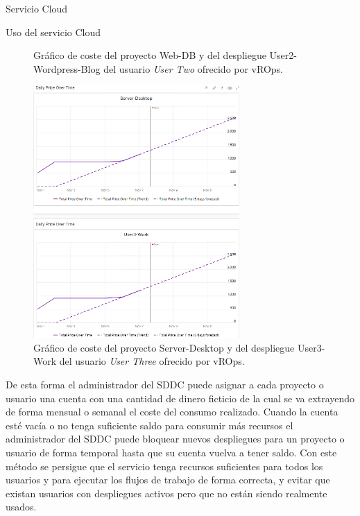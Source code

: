 \begin{subsection}{Servicio Cloud}
\begin{subsubsection}{Uso del servicio Cloud}
\begin{figure}[h]
            \caption{Gráfico de coste del proyecto Web-DB y del despliegue User2-Wordpress-Blog del usuario \textit{User Two} ofrecido por vROps.}
            \label{fig:vrops-graf-user2}
        \end{figure}
        \FloatBarrier
        \begin{figure}[h]
            \centering
            \includegraphics[width=0.7\textwidth]{imaxes/pruebaconcepto/vrealize/vrops-graf-user3.png}
            \caption{Gráfico de coste del proyecto Server-Desktop y del despliegue User3-Work del usuario \textit{User Three} ofrecido por vROps.}
            \label{fig:vrops-graf-user3}
        \end{figure}
        \FloatBarrier
        De esta forma el administrador del SDDC puede asignar a cada proyecto o usuario una cuenta con una cantidad de dinero ficticio de la cual se va extrayendo de forma mensual o semanal el coste del consumo realizado. Cuando la cuenta esté vacía o no tenga suficiente saldo para consumir más recursos el administrador del SDDC puede bloquear nuevos despliegues para un proyecto o usuario de forma temporal  hasta que su cuenta vuelva a tener saldo. Con este método se persigue que el servicio tenga recursos suficientes para todos los usuarios y para ejecutar los flujos de trabajo de forma correcta, y evitar que existan usuarios con despliegues activos pero que no están siendo realmente usados.


\end{subsubsection}
\end{subsection}

